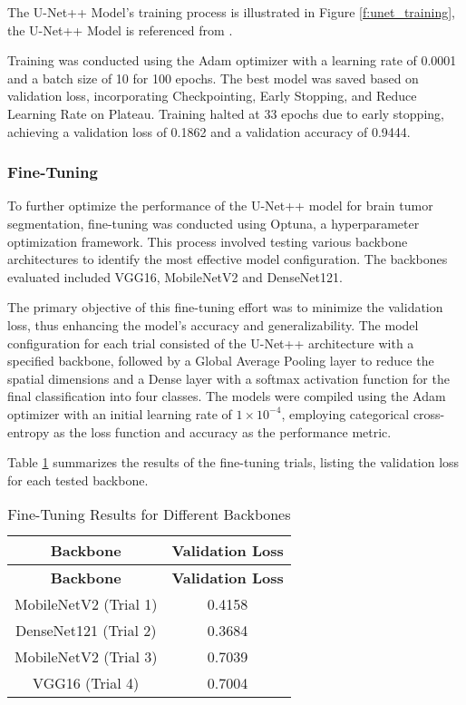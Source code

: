 The U-Net++ Model's training process is illustrated in Figure \ref{f:unet_training}, the U-Net++ Model is referenced from \cite{zhou_unet_2018}.

Training was conducted using the Adam optimizer with a learning rate of 0.0001 and a batch size of 10 for 100 epochs. The best model was saved based on validation loss, incorporating Checkpointing, Early Stopping, and Reduce Learning Rate on Plateau. Training halted at 33 epochs due to early stopping, achieving a validation loss of 0.1862 and a validation accuracy of 0.9444.

\subsubsection{Fine-Tuning}

To further optimize the performance of the U-Net++ model for brain tumor segmentation, fine-tuning was conducted using Optuna, a hyperparameter optimization framework. This process involved testing various backbone architectures to identify the most effective model configuration. The backbones evaluated included VGG16, MobileNetV2 and DenseNet121. 

The primary objective of this fine-tuning effort was to minimize the validation loss, thus enhancing the model's accuracy and generalizability. The model configuration for each trial consisted of the U-Net++ architecture with a specified backbone, followed by a Global Average Pooling layer to reduce the spatial dimensions and a Dense layer with a softmax activation function for the final classification into four classes. The models were compiled using the Adam optimizer with an initial learning rate of $1 \times 10^{-4}$, employing categorical cross-entropy as the loss function and accuracy as the performance metric.

Table \ref{tab:finetuning_results} summarizes the results of the fine-tuning trials, listing the validation loss for each tested backbone.

\begin{longtable}{|c|c|}
\caption{Fine-Tuning Results for Different Backbones}\label{tab:finetuning_results}
\hline
\textbf{Backbone} & \textbf{Validation Loss} \\
\hline
\endfirsthead
\hline
\textbf{Backbone} & \textbf{Validation Loss} \\
\hline
\endhead
\hline
\endfoot
\hline
\endlastfoot
MobileNetV2 (Trial 1) & 0.4158 \\
\hline
DenseNet121 (Trial 2) & 0.3684 \\
\hline
MobileNetV2 (Trial 3) & 0.7039 \\
\hline
VGG16 (Trial 4) & 0.7004 \\
\end{longtable}

